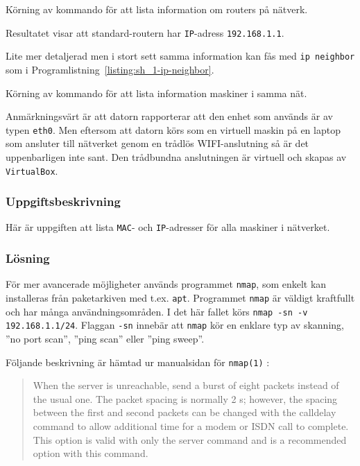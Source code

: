 \begin{listing}[H]
  \caption{Körning av kommando för att lista information om routers på nätverk.}
  \label{listing:sh_1-ip-route-list}
\end{listing}

Resultatet visar att standard-routern har \texttt{IP}-adress \texttt{192.168.1.1}.

Lite mer detaljerad men i stort sett samma information kan fås med \texttt{ip
neighbor} som i Programlistning~\ref{listing:sh_1-ip-neighbor}. 

\begin{listing}[H]
  \caption{Körning av kommando för att lista information maskiner i samma nät.}
  \label{listing:sh_1-ip-neighbor}
\end{listing}

Anmärkningsvärt är att datorn rapporterar att den enhet som används är av typen
\texttt{eth0}.  Men eftersom att datorn körs som en virtuell maskin på en
laptop som ansluter till nätverket genom en trådlös WIFI-anslutning så är det
uppenbarligen inte sant.  Den trådbundna anslutningen är virtuell och skapas av
\texttt{VirtualBox}.

\subsubsection{Uppgiftsbeskrivning}
Här är uppgiften att lista \texttt{MAC}- och \texttt{IP}-adresser för alla
maskiner i nätverket.

\subsubsection{Lösning}

För mer avancerade möjligheter används programmet \texttt{nmap}, som enkelt kan
installeras från paketarkiven med t.ex. \texttt{apt}.  Programmet \texttt{nmap}
är väldigt kraftfullt och har många användningsområden.  I det här fallet körs
\texttt{nmap -sn -v 192.168.1.1/24}.  Flaggan \texttt{-sn} innebär att
\texttt{nmap} kör en enklare typ av skanning, ''no port scan'', ''ping scan''
eller ''ping sweep''.

Följande beskrivning är hämtad ur manualsidan för \texttt{nmap(1)}
\cite{manpage:nmap}:

\begin{quotation}
When  the  server  is  unreachable, send a burst of eight packets
instead of the usual one.  The packet spacing is normally 2 s; however, the
spacing between the first and second packets can be changed with the calldelay
command to allow additional time for a modem or ISDN call to  complete.   This
option is valid with only the server command and is a recommended option with
this command.
\end{quotation}

